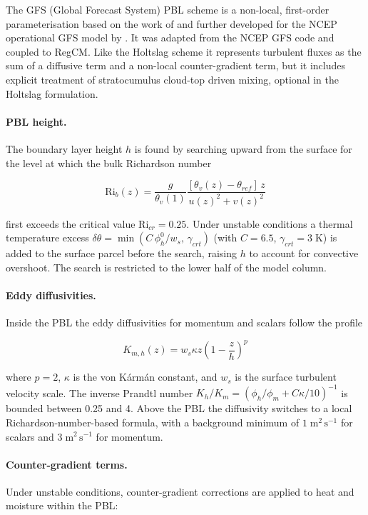 The GFS (Global Forecast System) PBL scheme is a non-local, first-order
parameterisation based on the work of \cite{Troen_86} and further developed for
the NCEP operational GFS model by \cite{Han_11}.  It was adapted from the
NCEP GFS code and coupled to RegCM.  Like the Holtslag scheme it represents
turbulent fluxes as the sum of a diffusive term and a non-local
counter-gradient term, but it includes explicit treatment of stratocumulus
cloud-top driven mixing, optional in the Holtslag formulation.

\paragraph{PBL height.}
The boundary layer height $h$ is found by searching upward from the surface for
the level at which the bulk Richardson number

\begin{equation}
  \mathrm{Ri}_b(z) = \frac{g}{\theta_v(1)}\frac{[\theta_v(z)-\theta_{ref}]\,z}{u(z)^2+v(z)^2}
\end{equation}

first exceeds the critical value $\mathrm{Ri}_{cr} = 0.25$.  Under unstable
conditions a thermal temperature excess
$\delta\theta = \min(C\,\phi_h^0/w_s,\,\gamma_{crt})$ (with $C=6.5$,
$\gamma_{crt}=3\;\mathrm{K}$) is added to the surface parcel before the
search, raising $h$ to account for convective overshoot.  The search is
restricted to the lower half of the model column.

\paragraph{Eddy diffusivities.}
Inside the PBL the eddy diffusivities for momentum and scalars follow the
profile

\begin{equation}
  K_{m,h}(z) = w_s \kappa z \left(1-\frac{z}{h}\right)^p
\end{equation}

where $p=2$, $\kappa$ is the von K\'{a}rm\'{a}n constant, and $w_s$ is the
surface turbulent velocity scale.  The inverse Prandtl number
$K_h/K_m = ({\phi_h}/{\phi_m} + C\kappa/10)^{-1}$ is bounded between
0.25 and 4.  Above the PBL the diffusivity switches to a local
Richardson-number-based formula, with a background minimum of
$1\;\mathrm{m^2\,s^{-1}}$ for scalars and $3\;\mathrm{m^2\,s^{-1}}$ for
momentum.

\paragraph{Counter-gradient terms.}
Under unstable conditions, counter-gradient corrections are applied to heat and
moisture within the PBL:

